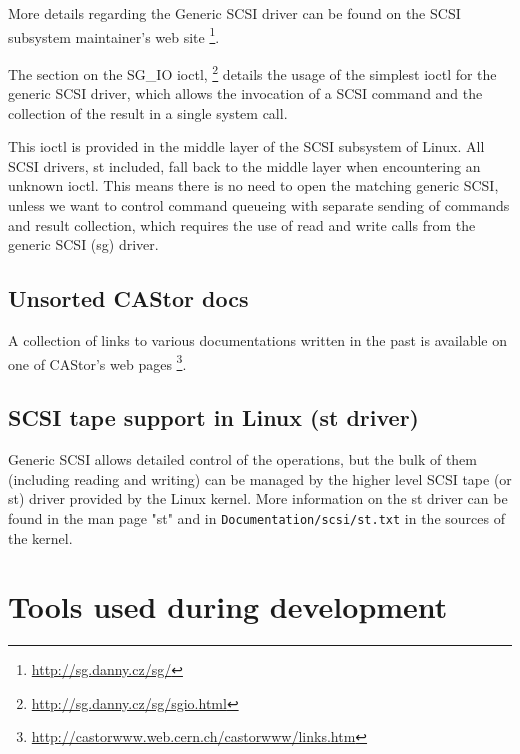 More details regarding the Generic SCSI driver can be found on the SCSI subsystem maintainer's web site 
       \footnote{ \href{http://sg.danny.cz/sg/}{http://sg.danny.cz/sg/} }.

The section on the SG\_IO ioctl, \footnote{ \href{http://sg.danny.cz/sg/sg\textunderscore{}io.html}{http://sg.danny.cz/sg/sg\textunderscore{}io.html} } details the usage of the 
simplest ioctl for the generic SCSI driver, which allows the invocation of a SCSI command and the collection of the 
result in a single system call.

This ioctl is provided in the middle layer of the SCSI subsystem of Linux. All SCSI drivers, st included, fall back
to the middle layer when encountering an unknown ioctl. This means there is no need to open the matching generic SCSI,
unless we want to control command queueing with separate sending of commands and result collection, which
requires the use of read and write calls from the generic SCSI (sg) driver.

\subsection{Unsorted CAStor docs}
A collection of links to various documentations written in the past is available on one of CAStor's web pages
       \footnote{ \href{http://castorwww.web.cern.ch/castorwww/links.htm}{http://castorwww.web.cern.ch/castorwww/links.htm} }.

\subsection{SCSI tape support in Linux (st driver)}
Generic SCSI allows detailed control of the operations, but the bulk of them (including reading and
writing) can be managed by the higher level SCSI tape (or st) driver provided by the Linux kernel.
More information on the st driver can be found in the man page "st" and in \verb#Documentation/scsi/st.txt#
in the sources of the kernel.

\section{Tools used during development}
